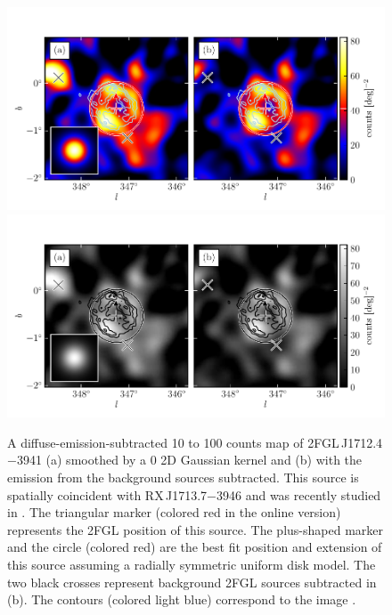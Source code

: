 \begin{figure}
    \ifcolorfigure
      \includegraphics{source_plots/source_RX_J1713d7-3946_color.pdf}
    \else
      \includegraphics{source_plots/source_RX_J1713d7-3946_bw.pdf}
    \fi
  \caption{
  A diffuse-emission-subtracted 10 \gev to 100 \gev counts map
  of 2FGL\,J1712.4$-$3941 (a) smoothed by a 0 2D
  Gaussian kernel and (b) with the emission from the background sources
  subtracted.  This source is spatially coincident with RX\,J1713.7$-$3946
  and was recently studied in \cite{abdo_2011a_observations-young}.  The triangular marker
  (colored red in the online version) represents the 2FGL position of
  this source.  The plus-shaped marker and the circle (colored red) are
  the best fit position and extension of this source assuming a radially
  symmetric uniform disk model.  
  The two black crosses represent background 2FGL sources subtracted in (b).
  The contours (colored light blue)
  correspond to the \tev image \citep{aharonian_2007a_primary-particle}.  
  }
\end{figure}


